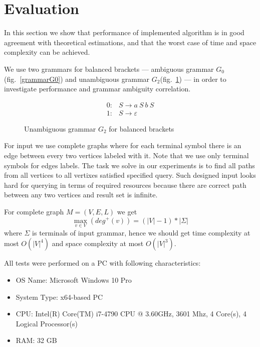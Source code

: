 \section{Evaluation}

In this section we show that performance of implemented algorithm is in good agreement with theoretical estimations, and that the worst case of time and space complexity can be achieved.  

We use two grammars for balanced brackets --- ambiguous grammar $G_0$(fig.~\ref{grammarG0}) and unambiguous grammar $G_2$(fig.~\ref{grammarG2}) --- in order to investigate performance and grammar ambiguity correlation.

\begin{figure}[ht]
   \begin{center}
   \[
\begin{array}{rl}
   0: & S \rightarrow a \ S \ b \ S \\ 
   1: & S \rightarrow \varepsilon
\end{array}
\]
   \caption{Unambiguous grammar $G_2$ for balanced brackets}
   \label{grammarG2}        
   \end{center}
\end{figure}

For input we use complete graphs where for each terminal symbol there is an edge between every two vertices labeled with it.
Note that we use only terminal symbols for edges labels.  
The task we solve in our experiments is to find all paths from all vertices to all vertixes satisfied specified query.
Such designed input looks hard for querying in terms of required resources because there are correct path between any two vertices and result set is infinite.

For complete graph $M=(V,E,L)$ we get $$\max\limits_{v \in V}\left(deg^+\left(v\right)\right) = (|V| - 1)*|\Sigma|$$ where $\Sigma$ is terminals of input grammar, hence we should get time complexity at most $O(|V|^4)$ and space complexity at most $O(|V|^3)$.

All tests were performed on a PC with following characteristics:
\begin{itemize}
\item OS Name: Microsoft Windows 10 Pro
\item System Type: x64-based PC
\item CPU: Intel(R) Core(TM) i7-4790 CPU @ 3.60GHz, 3601 Mhz, 4 Core(s), 4 Logical Processor(s)
\item RAM: 32 GB
\end{itemize}

